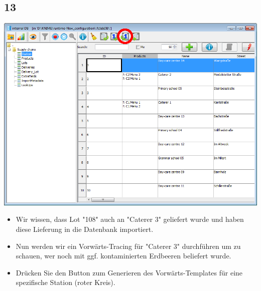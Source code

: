 \documentclass{beamer}
\begin{document}
\subsection{13}
\begin{frame}
	\begin{center}
  		\includegraphics[height=0.45\textheight]{13.png}
	\end{center}
	\begin{itemize}
		\item Wir wissen, dass Lot "108" auch an "Caterer 3" geliefert wurde und haben diese Lieferung in die Datenbank importiert.
		\item Nun werden wir ein Vorwärts-Tracing für "Caterer 3" durchführen um zu schauen, wer noch mit ggf. kontaminierten Erdbeeren beliefert wurde.
		\item Drücken Sie den Button zum Generieren des Vorwärts-Templates für eine spezifische Station (roter Kreis).
	\end{itemize}
\end{frame}
\end{document}
